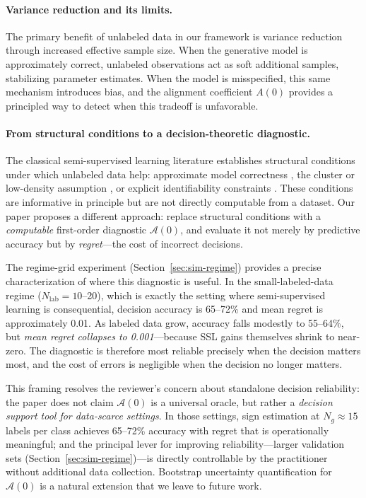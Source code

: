 \documentclass[11pt]{article}
\theoremstyle{definition}
\newcommand{\calA}{\mathcal{A}}
\begin{document}
\paragraph{Variance reduction and its limits.}
The primary benefit of unlabeled data in our framework is variance reduction
through increased effective sample size.
When the generative model is approximately correct, unlabeled observations
act as soft additional samples, stabilizing parameter estimates.
When the model is misspecified, this same mechanism introduces bias,
and the alignment coefficient $A(0)$ provides a principled way to detect
when this tradeoff is unfavorable.

\paragraph{From structural conditions to a decision-theoretic diagnostic.}
The classical semi-supervised learning literature establishes structural
conditions under which unlabeled data help: approximate model correctness
\citep{nigam2000text}, the cluster or low-density assumption
\citep{chapelle2006semi}, or explicit identifiability constraints
\citep{mclachlan2019finite}.
These conditions are informative in principle but are not directly
computable from a dataset.
Our paper proposes a different approach: replace structural conditions
with a \emph{computable} first-order diagnostic \(\calA(0)\), and evaluate
it not merely by predictive accuracy but by \emph{regret}---the cost of
incorrect decisions.

The regime-grid experiment (Section~\ref{sec:sim-regime}) provides a
precise characterization of where this diagnostic is useful.
In the small-labeled-data regime (\(N_{\mathrm{lab}}=10\)--20), which is
exactly the setting where semi-supervised learning is consequential,
decision accuracy is 65--72\% and mean regret is approximately 0.01.
As labeled data grow, accuracy falls modestly to 55--64\%, but
\emph{mean regret collapses to 0.001}---because SSL gains themselves
shrink to near-zero.
The diagnostic is therefore most reliable precisely when the decision
matters most, and the cost of errors is negligible when the decision
no longer matters.

This framing resolves the reviewer's concern about standalone decision
reliability: the paper does not claim \(\calA(0)\) is a universal oracle,
but rather a \emph{decision support tool for data-scarce settings}.
In those settings, sign estimation at \(N_g\approx 15\) labels per class
achieves 65--72\% accuracy with regret that is operationally meaningful;
and the principal lever for improving reliability---larger validation
sets (Section~\ref{sec:sim-regime})---is directly controllable by the
practitioner without additional data collection.
Bootstrap uncertainty quantification for \(\calA(0)\) is a natural
extension that we leave to future work.
\end{document}
